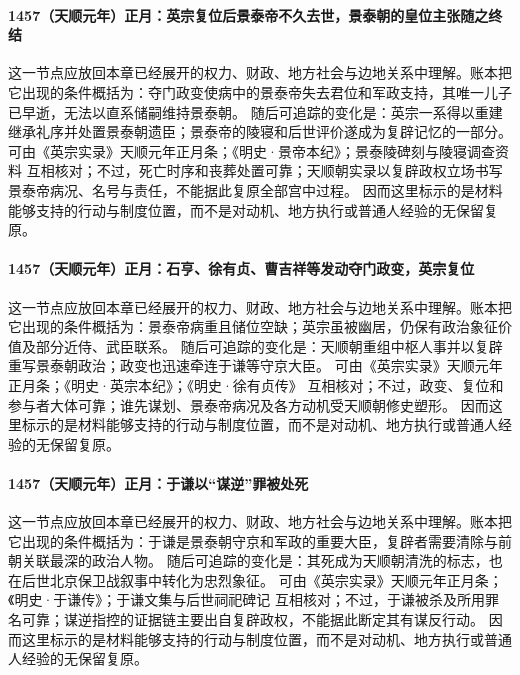 \paragraph{1457（天顺元年）正月：英宗复位后景泰帝不久去世，景泰朝的皇位主张随之终结} 这一节点应放回本章已经展开的权力、财政、地方社会与边地关系中理解。账本把它出现的条件概括为：夺门政变使病中的景泰帝失去君位和军政支持，其唯一儿子已早逝，无法以直系储嗣维持景泰朝。 随后可追踪的变化是：英宗一系得以重建继承礼序并处置景泰朝遗臣；景泰帝的陵寝和后世评价遂成为复辟记忆的一部分。 可由《英宗实录》天顺元年正月条；《明史·景帝本纪》；景泰陵碑刻与陵寝调查资料 互相核对；不过，死亡时序和丧葬处置可靠；天顺朝实录以复辟政权立场书写景泰帝病况、名号与责任，不能据此复原全部宫中过程。 因而这里标示的是材料能够支持的行动与制度位置，而不是对动机、地方执行或普通人经验的无保留复原。

\paragraph{1457（天顺元年）正月：石亨、徐有贞、曹吉祥等发动夺门政变，英宗复位} 这一节点应放回本章已经展开的权力、财政、地方社会与边地关系中理解。账本把它出现的条件概括为：景泰帝病重且储位空缺；英宗虽被幽居，仍保有政治象征价值及部分近侍、武臣联系。 随后可追踪的变化是：天顺朝重组中枢人事并以复辟重写景泰朝政治；政变也迅速牵连于谦等守京大臣。 可由《英宗实录》天顺元年正月条；《明史·英宗本纪》；《明史·徐有贞传》 互相核对；不过，政变、复位和参与者大体可靠；谁先谋划、景泰帝病况及各方动机受天顺朝修史塑形。 因而这里标示的是材料能够支持的行动与制度位置，而不是对动机、地方执行或普通人经验的无保留复原。

\paragraph{1457（天顺元年）正月：于谦以“谋逆”罪被处死} 这一节点应放回本章已经展开的权力、财政、地方社会与边地关系中理解。账本把它出现的条件概括为：于谦是景泰朝守京和军政的重要大臣，复辟者需要清除与前朝关联最深的政治人物。 随后可追踪的变化是：其死成为天顺朝清洗的标志，也在后世北京保卫战叙事中转化为忠烈象征。 可由《英宗实录》天顺元年正月条；《明史·于谦传》；于谦文集与后世祠祀碑记 互相核对；不过，于谦被杀及所用罪名可靠；谋逆指控的证据链主要出自复辟政权，不能据此断定其有谋反行动。 因而这里标示的是材料能够支持的行动与制度位置，而不是对动机、地方执行或普通人经验的无保留复原。

